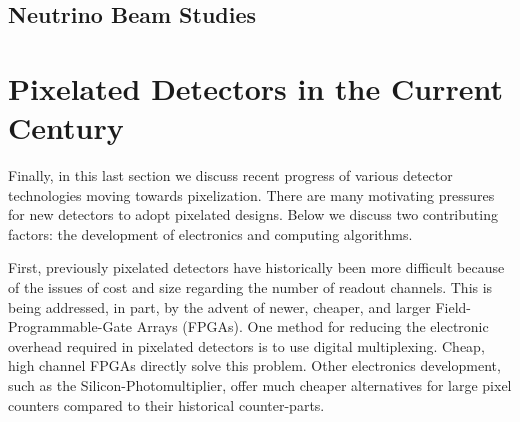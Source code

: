 
\subsection{Neutrino Beam Studies}



\section{Pixelated Detectors in the Current Century}

Finally, in this last section we discuss recent progress of various detector technologies moving towards pixelization.
There are many motivating pressures for new detectors to adopt pixelated designs. 
Below we discuss two contributing factors: the development of electronics and computing algorithms.

First, previously pixelated detectors have historically been more difficult because of the issues of cost and size regarding the number of readout channels.
This is being addressed, in part, by the advent of newer, cheaper, and larger Field-Programmable-Gate Arrays (FPGAs).
One method for reducing the electronic overhead required in pixelated detectors is to use digital multiplexing.
Cheap, high channel FPGAs directly solve this problem. 
Other electronics development, such as the Silicon-Photomultiplier, offer much cheaper alternatives for large pixel counters compared to their historical counter-parts. 

